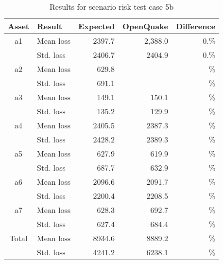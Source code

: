 \begin{table}[htbp]

\centering
\begin{tabular}{ c l r r r }

\hline
\rowcolor{anti-flashwhite}
\bf{Asset} & \bf{Result} & \bf{Expected} & \bf{OpenQuake} & \bf{Difference}\\
\hline
a1 & Mean loss & 2397.7 & 2,388.0 & 0.\% \\
 & Std. loss & 2406.7 & 2404.9 & 0.\% \\
\hline
a2 & Mean loss & 629.8 &  & \% \\
 & Std. loss & 691.1 &  & \% \\
\hline
a3 & Mean loss & 149.1 & 150.1 & \% \\
 & Std. loss & 135.2 & 129.9 & \% \\
\hline
a4 & Mean loss & 2405.5 & 2387.3 & \% \\
 & Std. loss & 2428.2 & 2389.3 & \% \\
\hline
a5 & Mean loss & 627.9 & 619.9 & \% \\
 & Std. loss & 687.7 & 632.9 & \% \\
\hline
a6 & Mean loss & 2096.6 & 2091.7 & \% \\
 & Std. loss & 2200.4 & 2208.5 & \% \\
\hline
a7 & Mean loss & 628.3 & 692.7 & \% \\
 & Std. loss & 627.4 & 684.4 & \% \\
\hline
Total & Mean loss & 8934.6 & 8889.2 & \% \\
 & Std. loss & 4241.2 & 6238.1 & \% \\
\hline
\end{tabular}

\caption{Results for scenario risk test case 5b}
\label{tab:result-scenario-risk-5b}
\end{table}
